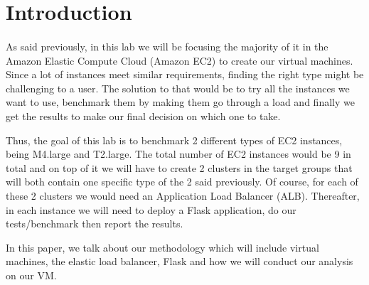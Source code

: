 \documentclass[12pt]{article}
\begin{document}
\section{Introduction} \label{sec:introduction}
	\paragraph{} As said previously, in this lab we will be focusing the majority of
	it in the Amazon Elastic Compute Cloud (Amazon EC2) to create our virtual machines.
	Since a lot of instances meet similar requirements, finding the right type might be
	challenging to a user. The solution to that would be to try all the instances we want 
	to use, benchmark them by making them go through a load and finally we get the results 
	to make our final decision on which one to take.
	\cite{1}\bigskip

	Thus, the goal of this lab is to benchmark 2 different types of EC2 instances, being 
	M4.large and T2.large. The total number of EC2 instances would be 9 in total and on top 
	of it we will have to create 2 clusters in the target groups that will both contain one 
	specific type of the 2 said previously. Of course, for each of these 2 clusters we would 
	need an Application Load Balancer (ALB). Thereafter, in each instance we will need to deploy 
	a Flask application, do our tests/benchmark then report the results.
	\bigskip

	In this paper, we talk about our methodology which will include virtual machines, the elastic 
	load balancer, Flask and how we will conduct our analysis on our VM.
	\bigskip

	\pagebreak
\end{document}
